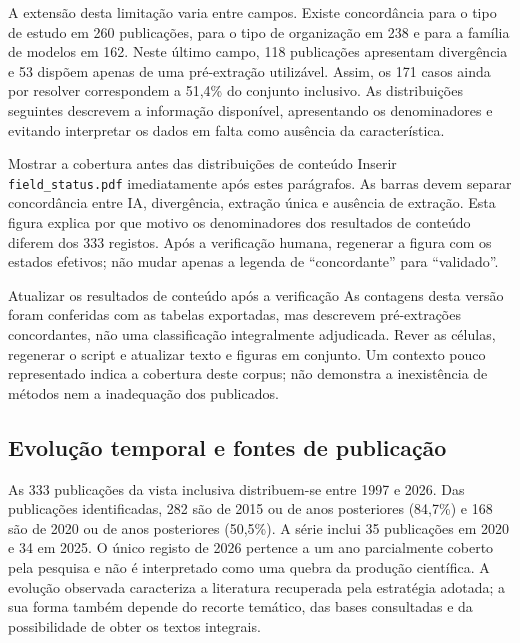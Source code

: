 A extensão desta limitação varia entre campos. Existe concordância
para o tipo de estudo em 260 publicações, para o tipo de organização
em 238 e para a família de modelos em 162. Neste último campo,
118 publicações apresentam divergência e 53 dispõem apenas de uma
pré-extração utilizável. Assim, os 171 casos ainda por resolver
correspondem a 51,4\% do conjunto inclusivo. As distribuições seguintes
descrevem a informação disponível, apresentando os denominadores e
evitando interpretar os dados em falta como ausência da característica.

{Mostrar a cobertura antes das distribuições de conteúdo}
{Inserir \texttt{field\_status.pdf} imediatamente após estes parágrafos.
As barras devem separar concordância entre IA, divergência, extração
única e ausência de extração. Esta figura explica por que motivo os
denominadores dos resultados de conteúdo diferem dos 333 registos.
Após a verificação humana, regenerar a figura com os estados efetivos;
não mudar apenas a legenda de ``concordante'' para ``validado''.}%

{Atualizar os resultados de conteúdo após a verificação}
{As contagens desta versão foram conferidas com as tabelas exportadas,
mas descrevem pré-extrações concordantes, não uma classificação
integralmente adjudicada. Rever as células, regenerar o script e
atualizar texto e figuras em conjunto. Um contexto pouco representado
indica a cobertura deste corpus; não demonstra a inexistência de
métodos nem a inadequação dos publicados.}%

\subsection{Evolução temporal e fontes de publicação}

As 333 publicações da vista inclusiva distribuem-se entre 1997 e 2026.
Das publicações identificadas, 282 são de 2015 ou de anos posteriores
(84,7\%) e 168 são de 2020 ou de anos posteriores (50,5\%). A série
inclui 35 publicações em 2020 e 34 em 2025. O único registo de 2026
pertence a um ano parcialmente coberto pela pesquisa e não é
interpretado como uma quebra da produção científica. A evolução
observada caracteriza a literatura recuperada pela estratégia
adotada; a sua forma também depende do recorte temático, das bases
consultadas e da possibilidade de obter os textos integrais.

